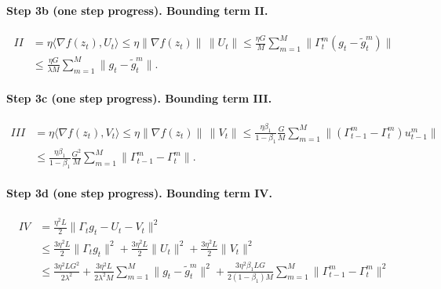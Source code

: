 \paragraph{Step 3b (one step progress). Bounding term II.}
\begin{align*}
II &= \eta\langle \nabla f(z_t), U_t \rangle
   \leq \eta\|\nabla f(z_t)\|\,\|U_t\|
   \leq \frac{\eta G}{M}\sum_{m=1}^{M}\|\Gamma_t^m(g_t - \widetilde{g}_t^m)\| \\
&\leq \frac{\eta G}{\lambda M}\sum_{m=1}^{M}\|g_t - \widetilde{g}_t^m\|.
\end{align*}

\paragraph{Step 3c (one step progress). Bounding term III.}
\begin{align*}
III &= \eta\langle \nabla f(z_t), V_t \rangle
   \leq \eta\|\nabla f(z_t)\|\,\|V_t\|
   \leq \frac{\eta\beta_1}{1-\beta_1}\frac{G}{M}\sum_{m=1}^{M}\|(\Gamma_{t-1}^m - \Gamma_t^m) u_{t-1}^m\| \\
&\leq \frac{\eta\beta_1}{1-\beta_1}\frac{G^2}{M}\sum_{m=1}^{M}\|\Gamma_{t-1}^m - \Gamma_t^m\|.
\end{align*}

\paragraph{Step 3d (one step progress). Bounding term IV.}
\begin{align*}
IV &= \frac{\eta^2 L}{2}\|\Gamma_t g_t - U_t - V_t\|^2 \\
&\leq \frac{3\eta^2 L}{2}\|\Gamma_t g_t\|^2
   + \frac{3\eta^2 L}{2}\|U_t\|^2
   + \frac{3\eta^2 L}{2}\|V_t\|^2 \\
&\leq \frac{3\eta^2 L G^2}{2\lambda^2}
   + \frac{3\eta^2 L}{2\lambda^2 M}\sum_{m=1}^{M}\|g_t - \widetilde{g}_t^m\|^2
   + \frac{3\eta^2 \beta_1 L G}{2(1-\beta_1)M}\sum_{m=1}^{M}\|\Gamma_{t-1}^m - \Gamma_t^m\|^2
\end{align*}

